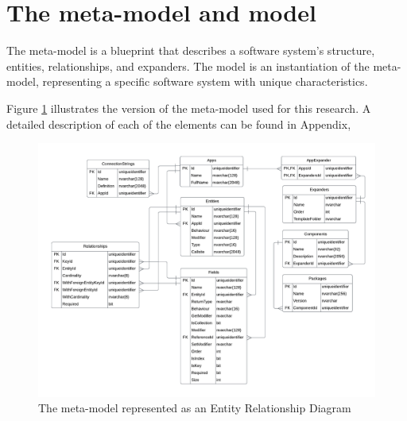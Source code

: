 \section{The meta-model and model} \label{sec_artifact_meta_model}

The meta-model is a blueprint that describes a software system's structure, entities,
relationships, and expanders. The model is an instantiation of the meta-model,
representing a specific software system with unique characteristics. 

Figure \ref{fig_erd} illustrates the version of the meta-model used for this research. A
detailed description of each of the elements can be found in Appendix,

\begin{figure}[H]
    \centering
    \includegraphics[width=1\textwidth]{figures/erd.pdf}
    \caption[The meta-model represented as an Entity Relationship Diagram]{The meta-model represented as an Entity Relationship Diagram}
    \label{fig_erd}
\end{figure}